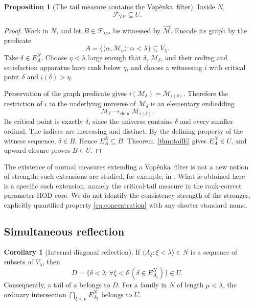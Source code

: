 \documentclass[11pt,letterpaper]{article}
\theoremstyle{definition}
\newtheorem{proposition}[definition]{Proposition}
\newtheorem{corollary}[definition]{Corollary}
\numberwithin{equation}{section}
\newcommand{\Vop}{Vop\v{e}nka}
\newcommand{\prelem}{\longrightarrow_{\mathrm{elem}}}
\newcommand{\pair}[2]{\langle #1,#2\rangle}
\begin{document}
\begin{proposition}[The tail measure contains the \Vop\ filter]\label{prop:filter}
Inside $N$,
\[
 \mathcal F_{\mathrm{VP}}\subseteq U.
\]
\end{proposition}

\begin{proof}
Work in $N$, and let $B\in\mathcal F_{\mathrm{VP}}$ be witnessed by $\vec{\mathcal M}$. Encode its graph by the predicate
\[
 A=\{\pair\alpha{\mathcal M_\alpha}:\alpha<\lambda\}\subseteq V_\lambda.
\]
Take $\delta\in E_A^N$. Choose $\eta<\lambda$ large enough that $\delta$, $\mathcal M_\delta$, and their coding and satisfaction apparatus have rank below $\eta$, and choose a witnessing $i$ with critical point $\delta$ and $i(\delta)>\eta$.

Preservation of the graph predicate gives
$i(\mathcal M_\delta)=\mathcal M_{i(\delta)}$. Therefore the restriction of $i$ to the underlying universe of $\mathcal M_\delta$ is an elementary embedding
\[
 \mathcal M_\delta\prelem\mathcal M_{i(\delta)}.
\]
Its critical point is exactly $\delta$, since the universe contains $\delta$ and every smaller ordinal. The indices are increasing and distinct. By the defining property of the witness sequence, $\delta\in B$. Hence $E_A^N\subseteq B$. Theorem~\ref{thm:tailE} gives $E_A^N\in U$, and upward closure proves $B\in U$.
\end{proof}

The existence of normal measures extending a \Vop\ filter is not a new notion of strength: such extensions are studied, for example, in \cite[Lemma~2.11]{poveda}. What is obtained here is a specific such extension, namely the critical-tail measure in the rank-correct parameter-HOD core. We do not identify the consistency strength of the stronger, explicitly quantified property \eqref{eq:concentration} with any shorter standard name.

\subsection{Simultaneous reflection}

\begin{corollary}[Internal diagonal reflection]\label{cor:diagonal}
If $\langle A_\xi:\xi<\lambda\rangle\in N$ is a sequence of subsets of $V_\lambda$, then
\[
 D=\{\delta<\lambda:\forall\xi<\delta\ (\delta\in E_{A_\xi}^N)\}\in U.
\]
Consequently, a tail of $a$ belongs to $D$. For a family in $N$ of length $\mu<\lambda$, the ordinary intersection $\bigcap_{\xi<\mu}E_{A_\xi}^N$ belongs to $U$.
\end{corollary}
\end{document}
